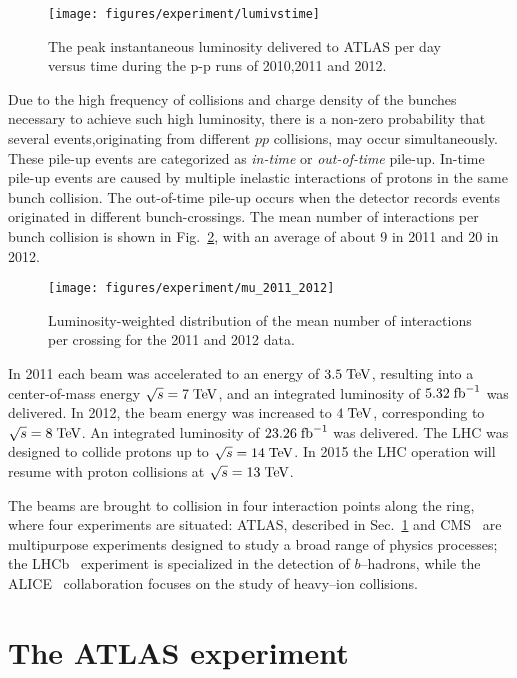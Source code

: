 \begin{figure}[ht]\centering
\texttt{[image: figures/experiment/lumivstime]}
\caption{
The peak instantaneous luminosity delivered to ATLAS per day versus
time during the p-p runs of 2010,2011 and 2012.}
\label{fig:lumivstime}
\end{figure}

Due to the high frequency of collisions and charge density of the
bunches necessary to achieve such high luminosity, there is a non-zero
probability that several events,originating from different $pp$ collisions, 
may occur simultaneously.
These pile-up events are categorized as {\it in-time} or {\it
  out-of-time} pile-up. 
In-time pile-up events are caused by  multiple inelastic interactions
of protons in the same bunch collision.
The out-of-time pile-up occurs when the detector records events
originated in different bunch-crossings.
The mean number of interactions per bunch collision is shown in
Fig.~\ref{fig:mu}, with an average of about 9 in 2011 and 20 in 2012.

\begin{figure}[ht]\centering
\texttt{[image: figures/experiment/mu\_2011\_2012]}
\caption{
Luminosity-weighted distribution of the mean number of interactions
per crossing for the 2011 and 2012 data.}
\label{fig:mu}
\end{figure}

In 2011 each beam was accelerated to an energy of \mbox{$3.5 \; \mathrm{TeV}$}, 
resulting into a center-of-mass energy \mbox{$\sqrt{s} = 7 \; \mathrm{TeV}$}, and
an integrated luminosity of $5.32\; \mathrm{fb}^{-1}{}$ was delivered.
In 2012, the beam energy was increased to \mbox{$4 \; \mathrm{TeV}$}, 
corresponding to \mbox{$\sqrt{s} = 8 \; \mathrm{TeV}$}. An integrated luminosity
of $23.26\; \mathrm{fb}^{-1}{}$ was delivered.
The LHC was designed to collide protons up to \mbox{$\sqrt{s} = 14
  \; \mathrm{TeV}$}. In 2015 the LHC operation will resume with proton collisions
at \mbox{$\sqrt{s} = 13 \; \mathrm{TeV}$}. 

The beams are brought to collision in four interaction points along
the ring, where four experiments are situated: 
ATLAS, described in Sec.~\ref{sec:ATLAS} and CMS~\cite{cms} are
multipurpose experiments designed to study a broad range of physics
processes; the LHCb~\cite{lhcb} experiment is specialized in the
detection of $b$--hadrons, while the ALICE~\cite{alice} collaboration
focuses on the study of heavy--ion collisions.

\section{The ATLAS experiment}
\label{sec:ATLAS}

